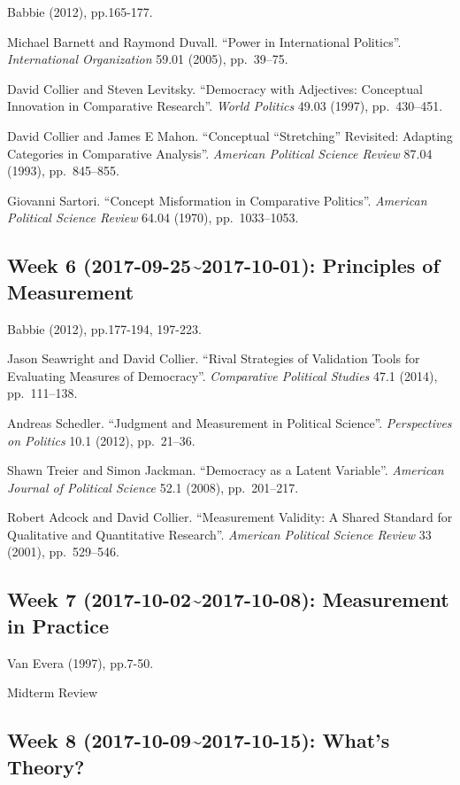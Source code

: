 \documentclass[11pt,]{article}
\theoremstyle{definition}
\theoremstyle{definition}
\theoremstyle{remark}
\begin{document}
Babbie (2012), pp.165-177.

Michael Barnett and Raymond Duvall. ``Power in International Politics''.
\emph{International Organization} 59.01 (2005), pp.~39--75.

David Collier and Steven Levitsky. ``Democracy with Adjectives:
Conceptual Innovation in Comparative Research''. \emph{World Politics}
49.03 (1997), pp.~430--451.

David Collier and James E Mahon. ``Conceptual ``Stretching'' Revisited:
Adapting Categories in Comparative Analysis''.
\emph{American Political Science Review} 87.04 (1993), pp.~845--855.

Giovanni Sartori. ``Concept Misformation in Comparative Politics''.
\emph{American Political Science Review} 64.04 (1970), pp.~1033--1053.

\subsection{Week 6 (2017-09-25\textasciitilde{}2017-10-01): Principles
of
Measurement}\label{week-6-2017-09-252017-10-01-principles-of-measurement}

Babbie (2012), pp.177-194, 197-223.

Jason Seawright and David Collier. ``Rival Strategies of Validation
Tools for Evaluating Measures of Democracy''.
\emph{Comparative Political Studies} 47.1 (2014), pp.~111--138.

Andreas Schedler. ``Judgment and Measurement in Political Science''.
\emph{Perspectives on Politics} 10.1 (2012), pp.~21--36.

Shawn Treier and Simon Jackman. ``Democracy as a Latent Variable''.
\emph{American Journal of Political Science} 52.1 (2008), pp.~201--217.

Robert Adcock and David Collier. ``Measurement Validity: A Shared
Standard for Qualitative and Quantitative Research''.
\emph{American Political Science Review} 33 (2001), pp.~529--546.

\subsection{Week 7 (2017-10-02\textasciitilde{}2017-10-08): Measurement
in Practice}\label{week-7-2017-10-022017-10-08-measurement-in-practice}

Van Evera (1997), pp.7-50.

Midterm Review

\subsection{Week 8 (2017-10-09\textasciitilde{}2017-10-15): What's
Theory?}\label{week-8-2017-10-092017-10-15-whats-theory}
\end{document}
